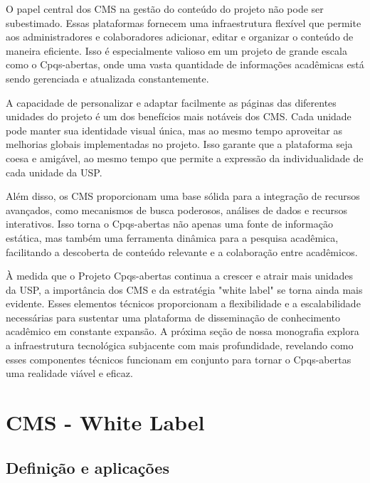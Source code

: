 \documentclass[12pt,twoside,english,brazilian]{article}
\begin{document}
O papel central dos CMS na gestão do conteúdo do projeto não pode ser subestimado. Essas plataformas fornecem uma infraestrutura flexível que permite aos administradores e colaboradores adicionar, editar e organizar o conteúdo de maneira eficiente. Isso é especialmente valioso em um projeto de grande escala como o Cpqs-abertas, onde uma vasta quantidade de informações acadêmicas está sendo gerenciada e atualizada constantemente.

A capacidade de personalizar e adaptar facilmente as páginas das diferentes unidades do projeto é um dos benefícios mais notáveis dos CMS. Cada unidade pode manter sua identidade visual única, mas ao mesmo tempo aproveitar as melhorias globais implementadas no projeto. Isso garante que a plataforma seja coesa e amigável, ao mesmo tempo que permite a expressão da individualidade de cada unidade da USP.

Além disso, os CMS proporcionam uma base sólida para a integração de recursos avançados, como mecanismos de busca poderosos, análises de dados e recursos interativos. Isso torna o Cpqs-abertas não apenas uma fonte de informação estática, mas também uma ferramenta dinâmica para a pesquisa acadêmica, facilitando a descoberta de conteúdo relevante e a colaboração entre acadêmicos.

À medida que o Projeto Cpqs-abertas continua a crescer e atrair mais unidades da USP, a importância dos CMS e da estratégia "white label" se torna ainda mais evidente. Esses elementos técnicos proporcionam a flexibilidade e a escalabilidade necessárias para sustentar uma plataforma de disseminação de conhecimento acadêmico em constante expansão. A próxima seção de nossa monografia explora a infraestrutura tecnológica subjacente com mais profundidade, revelando como esses componentes técnicos funcionam em conjunto para tornar o Cpqs-abertas uma realidade viável e eficaz.


\section{CMS - White Label}
\subsection{Definição e aplicações}
\end{document}
